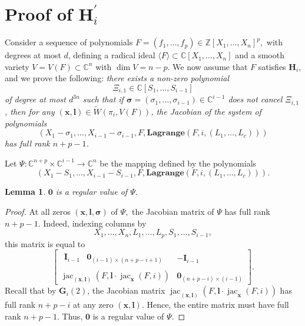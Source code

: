 \documentclass[12pt]{article}
\def\sW{\tilde{W}}
\def\bz{{{\bm 0}}}
\def\lb{{\bm l}}
\def\xb{{\bm x}}
\def\bI{\textbf{I}}
\DeclareMathOperator{\jac}{jac}
\newcommand{\ZZ}{{\mathbb{Z}}}
\def\C{\mathbb{C}}
\def\lagF{{\bm{Lagrange}}(F,i,(L_1,\hdots,L_c))}
\newtheorem{lemma}[theorem]{Lemma}
\begin{document}

\section{Proof of $\textbf{H}_i^{'}$}\label{Sec:Hip}

Consider a sequence of polynomials $F= (f_1,\hdots,f_p) \in
\ZZ[X_1,\hdots,X_n]^p,$ with degrees at most $d$, defining a radical
ideal $\langle F \rangle \subset \C[X_1,\hdots,X_n]$ and a smooth
variety $V=V(F) \subset \C^n$ with $\dim V = n-p$.  We now assume that
$F$ satisfies $\textbf{H}_i$, and we prove the following: {\em there
  exists a non-zero polynomial
  \[
  \Xi_{i,1} \in
  \C[S_1,\dots,S_{i-1}]
  \]
  of degree at most $d^{3n}$ such that if $
  \bm \sigma = (\sigma_1,\hdots,\sigma_{i-1}) \in \C^{i-1}$ does not cancel
  $\Xi_{i,1}$, then for any $(\xb,\lb) \in \sW(\pi_i,V(F))$, the Jacobian of the system of polynomials
  $$\left(X_1-\sigma_1,\dots,X_{i-1}-\sigma_{i-1},F,\lagF\right)$$ has full rank $n+p-1$.}

\smallskip

Let $\Psi: \C^{n+p} \times \C^{i-1} \rightarrow \C^{n}$ be the mapping defined by the polynomials
\[
  \left(X_1-S_1,\dots,X_{i-1}-S_{i-1},F,\lagF\right).
\]
%
\begin{lemma}
  $\bz$ is a regular value of $\Psi.$
\end{lemma}
\begin{proof}
At all zeros $(\xb,\lb,\bm \sigma)$ of $\Psi,$ the Jacobian matrix of
$\Psi$ has full rank $n+p-1$. Indeed, indexing columns 
    by 
    \[
    X_1,\dots,X_n,L_1,\hdots,L_p,S_1,\dots,S_{i-1},
    \]
    this matrix is equal to
    \[
    \left[ 
    \begin{array}{cc}
    \begin{array}{cc}
    \bI_{i-1}     & \bz_{(i-1)\times (n+p-i+1)}  
    \end{array}  &-\bI_{i-1}\\
    \jac_{(\xb,\bm l)}\left( F,\lb \cdot \jac_{\xb} (F,i)  \right) & \bz_{(n+p-i)\times (i-1)}
    \end{array}
    \right].
    \]
    Recall that by $\bm G_i(2)$, the Jacobian matrix $\jac_{(\xb,\bm l)}\left( F,\lb \cdot \jac_{\xb} (F,i) \right)$ has full rank $n+p-i$ at any zero $(\xb,\bm l)$. Hence, the entire    
    matrix must have full rank $n+p-1$. Thus,  $\bz$ is a regular value of $\Psi.$
    \end{proof}
\end{document}
